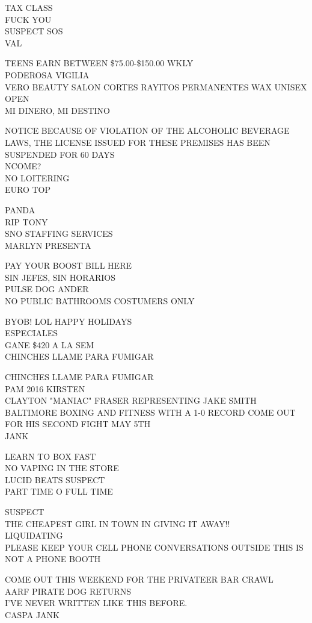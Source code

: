 \documentclass[10pt,letterpaper]{article}
\begin{document}
TAX CLASS\\
FUCK YOU\\
SUSPECT SOS\\
VAL

TEENS EARN BETWEEN \$75.00{-}\$150.00 WKLY\\
PODEROSA VIGILIA\\
VERO BEAUTY SALON CORTES RAYITOS PERMANENTES WAX UNISEX OPEN\\
MI DINERO, MI DESTINO

NOTICE BECAUSE OF VIOLATION OF THE ALCOHOLIC BEVERAGE LAWS, THE LICENSE ISSUED FOR THESE PREMISES HAS BEEN SUSPENDED FOR 60 DAYS\\
NCOME?\\
NO LOITERING\\
EURO TOP

PANDA\\
RIP TONY\\
SNO STAFFING SERVICES\\
MARLYN PRESENTA

PAY YOUR BOOST BILL HERE\\
SIN JEFES, SIN HORARIOS\\
PULSE DOG ANDER\\
NO PUBLIC BATHROOMS COSTUMERS ONLY

BYOB! LOL HAPPY HOLIDAYS\\
ESPECIALES\\
GANE \$420 A LA SEM\\
CHINCHES LLAME PARA FUMIGAR

CHINCHES LLAME PARA FUMIGAR\\
PAM 2016 KIRSTEN\\
CLAYTON "MANIAC" FRASER REPRESENTING JAKE SMITH BALTIMORE BOXING AND FITNESS WITH A 1{-}0 RECORD COME OUT FOR HIS SECOND FIGHT MAY 5TH\\
JANK

LEARN TO BOX FAST\\
NO VAPING IN THE STORE\\
LUCID BEATS SUSPECT\\
PART TIME O FULL TIME

SUSPECT\\
THE CHEAPEST GIRL IN TOWN IN GIVING IT AWAY!!\\
LIQUIDATING\\
PLEASE KEEP YOUR CELL PHONE CONVERSATIONS OUTSIDE THIS IS NOT A PHONE BOOTH

COME OUT THIS WEEKEND FOR THE PRIVATEER BAR CRAWL\\
AARF PIRATE DOG RETURNS\\
I'VE NEVER WRITTEN LIKE THIS BEFORE.\\
CASPA JANK
\end{document}
